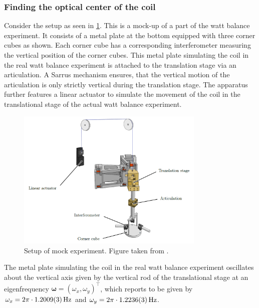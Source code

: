 \documentclass{report}
\numberwithin{tm}{section}
\newcommand\vect[1]{\ensuremath{\bm{#1}}}
\begin{document}
\subsubsection{Finding the optical center of the coil}
Consider the setup as seen in \cref{fig:setup}. This is a mock-up of a part of the watt balance experiment. It consists of a metal plate at the bottom equipped with three corner cubes as shown. Each corner cube has a corresponding interferometer measuring the vertical position of the corner cubes. This metal plate simulating the coil in the real watt balance experiment is attached to the translation stage via an articulation. A Sarrus mechanism ensures, that the vertical motion of the articulation is only strictly vertical during the translation stage. The apparatus further features a linear actuator to simulate the movement of the coil in the translational stage of the actual watt balance experiment.
\begin{figure}[h]
	\centering
	\includegraphics[width=0.8\textwidth]{figures/setup.png}
	\caption{Setup of mock experiment. Figure taken from \cite{Glardon.2024}.}
	\label{fig:setup}
\end{figure}

The metal plate simulating the coil in the real watt balance experiment oscillates about the vertical axis given by the vertical rod of the translational stage at an eigenfrequency $\vect{\omega} = (\omega_x, \omega_y)^\top$, which \cite[p.12]{Glardon.2024} reports to be given by $\omega_x = 2\pi \cdot \SI{1.2009\pm0.0003}{\hertz}$ and $\omega_y = 2\pi\cdot\SI{1.2236\pm0.0003}{\hertz}$.
\end{document}
